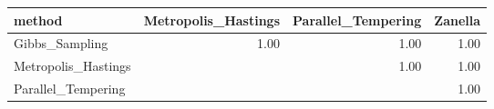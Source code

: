 \begin{table}[ht]
\centering
\begin{tabular}{lrrr}
  \hline
method & Metropolis\_Hastings & Parallel\_Tempering & Zanella \\ 
  \hline
Gibbs\_Sampling & 1.00 & 1.00 & 1.00 \\ 
  Metropolis\_Hastings &  & 1.00 & 1.00 \\ 
  Parallel\_Tempering &  &  & 1.00 \\ 
   \hline
\end{tabular}
\end{table}
